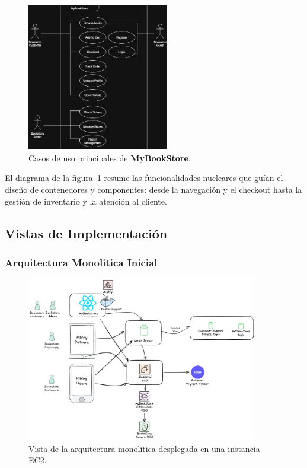 \begin{figure}[H]
  \centering
  \includegraphics[width=0.55\textwidth]{Figures/2. Architecture/Use-Case-Diagram.jpg}
  \caption{Casos de uso principales de \textbf{MyBookStore}.}
  \label{fig:use-cases}
\end{figure}

El diagrama de la figura~\ref{fig:use-cases} resume las funcionalidades
nucleares que guían el diseño de contenedores y
componentes: desde la navegación y el checkout hasta la
gestión de inventario y la atención al cliente.

\subsection{Vistas de Implementación}

\subsubsection{Arquitectura Monolítica Inicial}

\begin{figure}[H]
  \centering
  \includegraphics[width=0.9\textwidth]{Figures/2. Architecture/MonolithArchitecture.png}
  \caption{Vista de la arquitectura monolítica desplegada en una instancia EC2.}
  \label{fig:monolith}
\end{figure}

